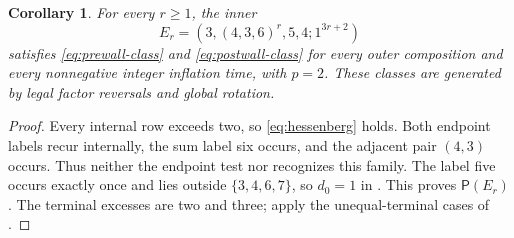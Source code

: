 \documentclass[11pt,a4paper]{amsart}
\numberwithin{equation}{section}
\theoremstyle{plain}
\newtheorem{corollary}[theorem]{Corollary}
\theoremstyle{definition}
\begin{document}
\begin{corollary}\label{cor:unbounded-family}
For every \(r\ge1\), the inner
\[
 E_r=(3,(4,3,6)^r,5,4;1^{3r+2})
\]
satisfies \eqref{eq:prewall-class} and \eqref{eq:postwall-class} for every outer composition and every nonnegative integer inflation time, with \(p=2\).  These classes are generated by legal factor reversals and global rotation.
\end{corollary}
\begin{proof}
Every internal row exceeds two, so \eqref{eq:hessenberg} holds.  Both endpoint labels recur internally, the sum label six occurs, and the adjacent pair \((4,3)\) occurs.  Thus neither the endpoint test nor  recognizes this family.  The label five occurs exactly once and lies outside \(\{3,4,6,7\}\), so \(d_0=1\) in .  This proves \(\mathsf P(E_r)\).  The terminal excesses are two and three; apply the unequal-terminal cases of .
\end{proof}
\end{document}
